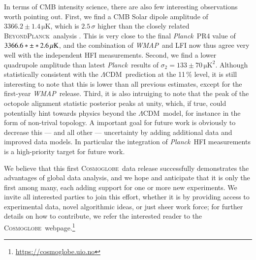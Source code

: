 \documentclass[twocolumn]{../../common/aa}
\def\WMAP{\emph{WMAP}}
\def\Planck{\emph{Planck}}
\def\LCDM{$\Lambda$CDM}
\newcommand{\bp}{\textsc{BeyondPlanck}}
\newcommand{\cosmoglobe}{\textsc{Cosmoglobe}}
\begin{document}
In terms of CMB intensity science, there are also few interesting observations worth pointing out. First, we find a CMB Solar dipole amplitude of $3366.2\pm1.4\,\mathrm{\mu K}$, which is $2.5\,\sigma$ higher than the closely related \bp\ analysis \citep{bp11}. This is very close to the final \Planck\ PR4 value of $3366.6*\pm*2.6\muK$, and the combination of \WMAP\ and LFI now thus agree very well with the independent HFI measurements. Second, we find a lower quadrupole amplitude than latest \Planck\ results of $\sigma_2=133\pm70\,\mathrm{\mu K^2}$. Although statistically consistent with the \LCDM\ prediction at the 11\,\% level, it is still interesting to note that this is lower than all previous estimates, except for the first-year \WMAP\ release. Third, it is also intruiging to note that the peak of the octopole alignment statistic posterior peaks at unity, which, if true, could potentially hint towards physics beyond the \LCDM\ model, for instance in the form of non-trival topology. A important goal for future work is obviously to decrease this --- and all other --- uncertainty by adding additional data and improved data models. In particular the integration of \Planck\ HFI measurements is a high-priority target for future work.

We believe that this first \cosmoglobe\ data release successfully demonstrates the advantages of global data analysis, and we hope and anticipate that it is only the first among many, each adding support for one or more new experiments. We invite all interested parties to join this effort, whether it is by providing access to experimental data, novel algorithmic ideas, or just sheer work force; for further details on how to contribute, we refer the interested reader to the \cosmoglobe\ webpage.\footnote{\url{https://cosmoglobe.uio.no}}


\end{document}
